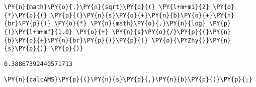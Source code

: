 {\par%
\vspace{-1\baselineskip}%
}%
\begin{notebookcell}[]%
\begin{addmargin}[\cellleftmargin]{0em}%
{\smaller%
\par%
%
\vspace{-1\smallerfontscale}%
\begin{Verbatim}[commandchars=\\\{\}]
\PY{n}{math}\PY{o}{.}\PY{n}{sqrt}\PY{p}{(} \PY{l+m+mi}{2} \PY{o}{*}\PY{p}{(} \PY{p}{(}\PY{n}{s}\PY{o}{+}\PY{n}{b}\PY{o}{+}\PY{n}{br}\PY{p}{)} \PY{o}{*} \PY{n}{math}\PY{o}{.}\PY{n}{log} \PY{p}{(}\PY{l+m+mf}{1.0} \PY{o}{+} \PY{n}{s}\PY{o}{/}\PY{p}{(}\PY{n}{b}\PY{o}{+}\PY{n}{br}\PY{p}{)}\PY{p}{)} \PY{o}{\PYZhy{}}\PY{n}{s}\PY{p}{)} \PY{p}{)}
\end{Verbatim}
%
\par%
\vspace{-1\smallerfontscale}}%
\end{addmargin}
\end{notebookcell}

\par\vspace{1\smallerfontscale}%
    \begin{addmargin}[\cellleftmargin]{0em}%
    {\smaller%
    \vspace{-1\smallerfontscale}%
    
    
    
    \begin{verbatim}
0.38867392440571713
    \end{verbatim}

    
}%
    \end{addmargin}%

{\par%
\vspace{-1\baselineskip}%
}%
\begin{notebookcell}[]%
\begin{addmargin}[\cellleftmargin]{0em}%
{\smaller%
\par%
%
\vspace{-1\smallerfontscale}%
\begin{Verbatim}[commandchars=\\\{\}]
\PY{n}{calcAMS}\PY{p}{(}\PY{n}{s}\PY{p}{,}\PY{n}{b}\PY{p}{)}\PY{p}{;}
\end{Verbatim}
%
\par%
\vspace{-1\smallerfontscale}}%
\end{addmargin}
\end{notebookcell}


